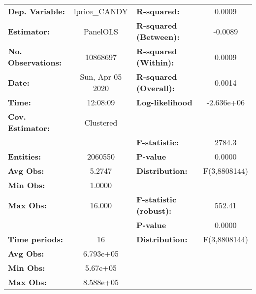 \documentclass{report}a
\begin{document}
\begin{center}
\begin{tabular}{lclc}
\toprule
\textbf{Dep. Variable:}       &   lprice\_CANDY    & \textbf{  R-squared:         }   &      0.0009      \\
\textbf{Estimator:}           &      PanelOLS      & \textbf{  R-squared (Between):}  &     -0.0089      \\
\textbf{No. Observations:}    &      10868697      & \textbf{  R-squared (Within):}   &      0.0009      \\
\textbf{Date:}                &  Sun, Apr 05 2020  & \textbf{  R-squared (Overall):}  &      0.0014      \\
\textbf{Time:}                &      12:08:09      & \textbf{  Log-likelihood     }   &    -2.636e+06    \\
\textbf{Cov. Estimator:}      &     Clustered      & \textbf{                     }   &                  \\
\textbf{}                     &                    & \textbf{  F-statistic:       }   &      2784.3      \\
\textbf{Entities:}            &      2060550       & \textbf{  P-value            }   &      0.0000      \\
\textbf{Avg Obs:}             &       5.2747       & \textbf{  Distribution:      }   &   F(3,8808144)   \\
\textbf{Min Obs:}             &       1.0000       & \textbf{                     }   &                  \\
\textbf{Max Obs:}             &       16.000       & \textbf{  F-statistic (robust):} &      552.41      \\
\textbf{}                     &                    & \textbf{  P-value            }   &      0.0000      \\
\textbf{Time periods:}        &         16         & \textbf{  Distribution:      }   &   F(3,8808144)   \\
\textbf{Avg Obs:}             &     6.793e+05      & \textbf{                     }   &                  \\
\textbf{Min Obs:}             &      5.67e+05      & \textbf{                     }   &                  \\
\textbf{Max Obs:}             &     8.588e+05      & \textbf{                     }   &                  \\
\bottomrule
\end{tabular}
\begin{tabular}{lcccccc}

\end{tabular}
\end{center}
\end{document}
